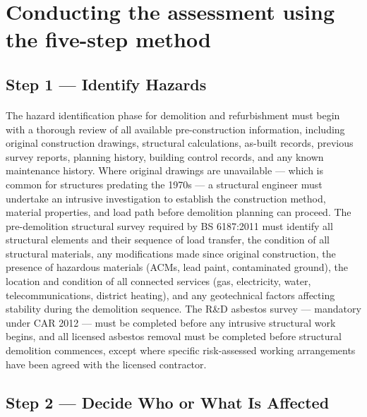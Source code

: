 \section{Conducting the assessment using the five-step method}

\subsection{Step 1 --- Identify Hazards}

\paragraph{}
The hazard identification phase for demolition and refurbishment must begin with a thorough review of all available pre-construction information, including original construction drawings, structural calculations, as-built records, previous survey reports, planning history, building control records, and any known maintenance history. Where original drawings are unavailable — which is common for structures predating the 1970s — a structural engineer must undertake an intrusive investigation to establish the construction method, material properties, and load path before demolition planning can proceed. The pre-demolition structural survey required by BS 6187:2011 must identify all structural elements and their sequence of load transfer, the condition of all structural materials, any modifications made since original construction, the presence of hazardous materials (ACMs, lead paint, contaminated ground), the location and condition of all connected services (gas, electricity, water, telecommunications, district heating), and any geotechnical factors affecting stability during the demolition sequence. The R\&D asbestos survey — mandatory under CAR 2012 — must be completed before any intrusive structural work begins, and all licensed asbestos removal must be completed before structural demolition commences, except where specific risk-assessed working arrangements have been agreed with the licensed contractor.

\subsection{Step 2 --- Decide Who or What Is Affected}

